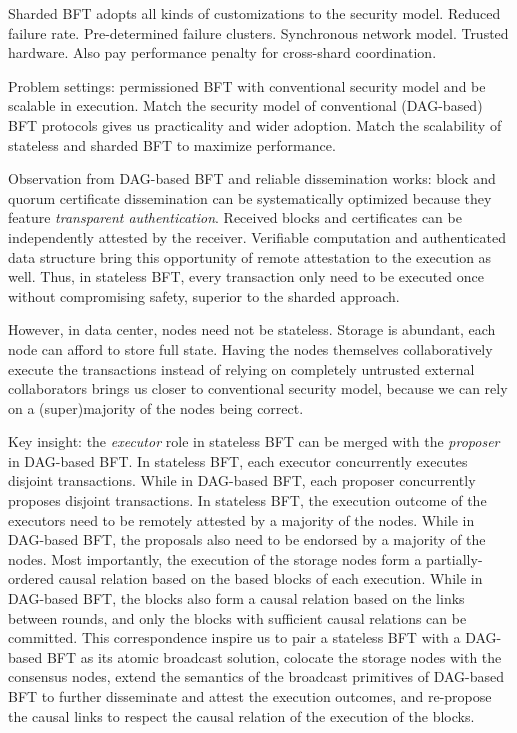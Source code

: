 Sharded BFT adopts all kinds of customizations to the security model.
Reduced failure rate.
Pre-determined failure clusters.
Synchronous network model.
Trusted hardware.
Also pay performance penalty for cross-shard coordination.

Problem settings: permissioned BFT with conventional security model and be scalable in execution.
Match the security model of conventional (DAG-based) BFT protocols gives us practicality and wider adoption.
Match the scalability of stateless and sharded BFT to maximize performance.

Observation from DAG-based BFT and reliable dissemination works: block and quorum certificate dissemination can be systematically optimized because they feature \emph{transparent authentication}.
Received blocks and certificates can be independently attested by the receiver.
Verifiable computation and authenticated data structure bring this opportunity of remote attestation to the execution as well.
Thus, in stateless BFT, every transaction only need to be executed once without compromising safety, superior to the sharded approach.

However, in data center, nodes need not be stateless.
Storage is abundant, each node can afford to store full state.
Having the nodes themselves collaboratively execute the transactions instead of relying on completely untrusted external collaborators brings us closer to conventional security model, because we can rely on a (super)majority of the nodes being correct.

Key insight: the \emph{executor} role in stateless BFT can be merged with the \emph{proposer} in DAG-based BFT.
In stateless BFT, each executor concurrently executes disjoint transactions.
While in DAG-based BFT, each proposer concurrently proposes disjoint transactions.
In stateless BFT, the execution outcome of the executors need to be remotely attested by a majority of the nodes.
While in DAG-based BFT, the proposals also need to be endorsed by a majority of the nodes.
Most importantly, the execution of the storage nodes form a partially-ordered causal relation based on the based blocks of each execution.
While in DAG-based BFT, the blocks also form a causal relation based on the links between rounds, and only the blocks with sufficient causal relations can be committed.
This correspondence inspire us to pair a stateless BFT with a DAG-based BFT as its atomic broadcast solution, colocate the storage nodes with the consensus nodes, extend the semantics of the broadcast primitives of DAG-based BFT to further disseminate and attest the execution outcomes, and re-propose the causal links to respect the causal relation of the execution of the blocks.

